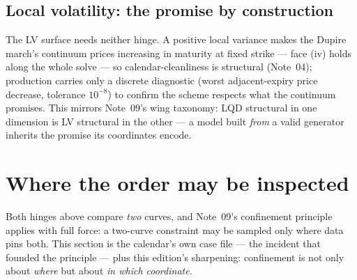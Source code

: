 \documentclass[11pt]{article}
\begin{document}
\subsection{Local volatility: the promise by construction}

The LV surface needs neither hinge.  A positive local variance makes
the Dupire march's continuum prices increasing in maturity at fixed
strike --- face (iv) holds along the whole solve --- so
calendar-cleanliness is structural (Note~04); production carries only a
discrete diagnostic (worst adjacent-expiry price decrease, tolerance
$10^{-8}$) to confirm the scheme respects what the continuum promises.
This mirrors Note~09's wing taxonomy: LQD structural in one dimension
is LV structural in the other --- a model built \emph{from} a valid
generator inherits the promise its coordinates encode.

\section{Where the order may be inspected}
\label{sec:where}

Both hinges above compare \emph{two} curves, and Note~09's confinement
principle applies with full force: a two-curve constraint may be
sampled only where data pins both.  This section is the calendar's own
case file --- the incident that founded the principle --- plus this
edition's sharpening: confinement is not only about \emph{where} but
about \emph{in which coordinate}.
\end{document}
